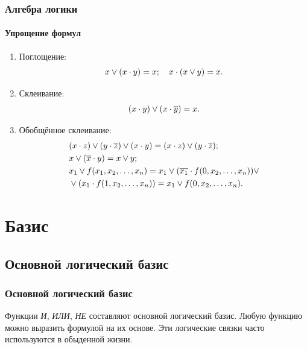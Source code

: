 \begin{frame}[allowframebreaks]
    \frametitle{Алгебра логики}
    \framesubtitle{Упрощение формул}
    
    \begin{enumerate}
        \item Поглощение:
            \[x\lor(x\cdot y) = x; \quad x\cdot(x\lor y) = x.\] 
            
        \item Склеивание:
            \[(x\cdot y)\lor(x\cdot\overline{y}) = x.\] 
            
        \item Обобщённое склеивание:
            \begin{align*}
                &(x\cdot z)\lor(y\cdot\overline{z})\lor(x\cdot y) = (x\cdot z)\lor(y\cdot \overline{z});\\
                &x\lor(\overline{x}\cdot y)=x\lor y;\\
                &x_1\lor f(x_1,x_2,\ldots,x_n) = x_1\lor (\overline{x_1}\cdot f(0,x_2,\ldots,x_n))\lor\\
                &\lor (x_1\cdot f(1,x_2,\ldots,x_n)) = x_1\lor f(0,x_2,\ldots,x_n).
            \end{align*}
    \end{enumerate}
\end{frame}

\section{Базис}

\subsection{Основной логический базис}

\begin{frame}
    \frametitle{Основной логический базис}
    
    Функции \textit{И}, \textit{ИЛИ}, \textit{НЕ} составляют \alert{основной логический базис}. Любую функцию можно выразить формулой на их основе. Эти логические связки часто используются в обыденной жизни.
\end{frame}

